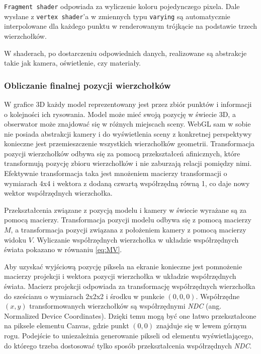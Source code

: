 \texttt{Fragment shader} odpowiada za wyliczenie koloru pojedynczego pixela. Dale wysłane z \texttt{vertex shader}'a w zmiennych typu \texttt{varying} są automatycznie interpolowane dla każdego punktu w renderowanym trójkącie na podstawie trzech wierzchołków.

W shaderach, po dostarczeniu odpowiednich danych, realizowane są abstrakcje takie jak kamera, oświetlenie, czy materiały.

\subsubsection{Obliczanie finalnej pozycji wierzchołków}

W grafice 3D każdy model reprezentowany jest przez zbiór punktów i informacji o kolejności ich rysowania. Model może mieć swoją pozycję w świecie 3D, a obserwator może znajdować się w różnych miejscach sceny. WebGL sam w sobie nie posiada abstrakcji kamery i do wyświetlenia sceny z konkretnej perspektywy konieczne jest przemieszczenie wszystkich wierzchołków geometrii. Transformacja pozycji wierzchołków odbywa się za pomocą przekształceń afinicznych, które transformują pozycję zbioru wierzchołków i nie zaburzają relacji pomiędzy nimi. Efektywnie transformacja taka jest mnożeniem macierzy transformacji o wymiarach 4x4 i wektora z dodaną czwartą współrzędną równą 1, co daje nowy wektor współrzędnych wierzchołka.

Przekształcenia związane z pozycją modelu i kamery w świecie wyrażane są za pomocą macierzy. Transformacja pozycji modelu odbywa się z pomocą macierzy $M$, a transformacja pozycji związana z położeniem kamery z pomocą macierzy widoku $V$. Wyliczanie współrzędnych wierzchołka w układzie współrzędnych świata pokazano w równaniu \ref{eq:MV}.

Aby uzyskać wyjściową pozycję piksela na ekranie konieczne jest pomnożenie macierzy projekcji i wektora pozycji wierzchołka w układzie współrzędnych świata. Macierz projekcji odpowiada za transformację współrzędnych wierzchołka do sześcianu o wymiarach 2x2x2 i środku w punkcie $(0, 0, 0)$. Współrzędne $(x, y)$ transformowanych wierzchołków są współrzędnymi \textit{NDC} (ang. Normalized Device Coordinates). Dzięki temu mogą być one łatwo przekształcone na piksele elementu Canvas, gdzie punkt $(0, 0)$ znajduje się w lewem górnym rogu. Podejście to uniezależnia generowanie pikseli od elementu wyświetlającego, do którego trzeba dostosować tylko sposób przekształcenia współrzędnych \textit{NDC}.

